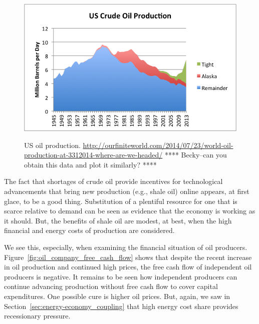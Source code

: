 \begin{figure}[!ht]
\centering\
\includegraphics[width=\linewidth]{Part_0/Chapter_Introduction/images/us-crude-oil-production-including-tight-oil.png}
\caption[US oil production]{US oil production.
\url{http://ourfiniteworld.com/2014/07/23/world-oil-production-at-3312014-where-are-we-headed/}
**** Becky--can you obtain this data and plot it similarly? ****
}
\label{fig:US_oil_production}
\end{figure}

The fact that shortages of crude oil provide incentives for 
technological advancements that bring new production (e.g., shale oil) online
appears, at first glace, to be a good thing.
Substitution of a plentiful resource for one that is scarce relative to demand
can be seen as evidence that the economy is working as it should.
But, the benefits of shale oil are modest, at best, when the
high financial and energy costs of production are considered.

We see this, especially, when examining the financial situation of oil producers.
Figure~\ref{fig:oil_company_free_cash_flow} 
shows that despite the recent increase in oil production
and continued high prices, 
the free cash flow of independent oil producers is negative.
It remains to be seen how independent producers can continue advancing 
production without free cash flow to cover capital expenditures.
One possible cure is higher oil prices.
But, again, we saw 
in Section~\ref{sec:energy-economy_coupling}
that high energy cost share 
provides recessionary pressure.

